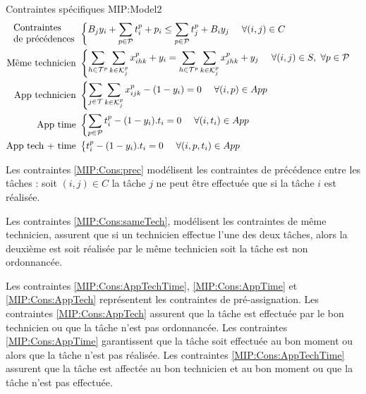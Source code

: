 \begin{modelIP}{Contraintes spécifiques }{MIP:Model2}
\begin{align}
\begin{array}{l}
\text{Contraintes}\\
\text{de précédences} 
\end{array}& 
\left\{
\begin{aligned}
B_jy_{i} + \sum_{p \in \mathcal{P}}t_{i}^{p} + p_i \leq \sum_{p \in \mathcal{P}}t_{j}^{p} +B_iy_{j} ~~~~\forall (i,j) \in C \label{MIP:Cons:prec}
\end{aligned}
\right.\\
\text{Même technicien }& 
\left\{
\begin{aligned}
\sum_{h \in \mathcal{T}^{p}}\sum_{k \in \mathcal{K}_{j}^{p}}x_{ihk}^{p} + y_{i} &= \sum_{h \in \mathcal{T}^{p}}\sum_{k \in \mathcal{K}_{j}^{p}}x_{jhk}^{p} + y_{j}~~~~\forall (i,j) \in S,~\forall p \in \mathcal{P} \label{MIP:Cons:sameTech}
\end{aligned}
\right.\\
\text{App technicien }& 
\left\{
\begin{aligned}
\sum_{j \in \mathcal{T}}\sum_{k \in \mathcal{K}_{j}^{p}}x_{ijk}^{p} - (1 - y_{i}) &= 0 ~~~~\forall (i,p) \in App \label{MIP:Cons:AppTech}
\end{aligned}
\right.\\
\text{App time }& 
\left\{
\begin{aligned}
\sum_{p \in \mathcal{P}}t_{i}^{p} - (1 - y_{i}). t_i &= 0~~~~\forall (i,t_i) \in App \label{MIP:Cons:AppTime}
\end{aligned}
\right.
\\
\text{App tech + time }& 
\left\{
\begin{aligned}
t_{i}^{p} - (1 - y_{i}) . t_i &= 0~~~~\forall (i,p,t_i) \in App \label{MIP:Cons:AppTechTime}
\end{aligned}
\right.
\end{align}
\end{modelIP}

Les contraintes \eqref{MIP:Cons:prec} modélisent les contraintes de précédence entre les tâches : soit $(i,j) \in C$ la tâche $j$ ne peut être effectuée que si la tâche $i$ est réalisée.

Les contraintes \eqref{MIP:Cons:sameTech}, modélisent les contraintes de même technicien, assurent que si un technicien effectue l'une des deux tâches, alors la deuxième est soit réalisée par le même technicien soit la tâche est non ordonnancée.

Les contraintes \eqref{MIP:Cons:AppTechTime}, \eqref{MIP:Cons:AppTime} et \eqref{MIP:Cons:AppTech} représentent les contraintes de pré-assignation. Les contraintes \eqref{MIP:Cons:AppTech} assurent que la tâche est effectuée par le bon technicien ou que la tâche n'est pas ordonnancée. Les contraintes \eqref{MIP:Cons:AppTime} garantissent que la tâche soit effectuée au bon moment ou alors que la tâche n'est pas réalisée. Les contraintes \eqref{MIP:Cons:AppTechTime} assurent que la tâche est affectée au bon technicien et au bon moment ou que la tâche n'est pas effectuée.

